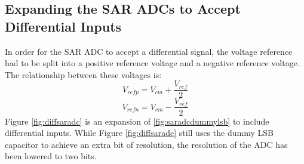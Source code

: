 \subsection{Expanding the SAR ADCs to Accept Differential Inputs}
In order for the SAR ADC to accept a differential signal, the voltage reference had to be split into a positive reference voltage and a negative reference voltage. The relationship between these voltages is:
\begin{equation}
\label{eq:vrefp}
V_{refp} = V_{cm}+\dfrac{V_{ref}}{2}
\end{equation}
\begin{equation}
\label{eq:vrefn}
V_{refn} = V_{cm}-\dfrac{V_{ref}}{2}
\end{equation}
Figure \ref{fig:diffsaradc} is an expansion of \ref{fig:saradcdummylsb} to include differential inputs. While Figure \ref{fig:diffsaradc} still uses the dummy LSB capacitor to achieve an extra bit of resolution, the resolution of the ADC has been lowered to two bits. 
